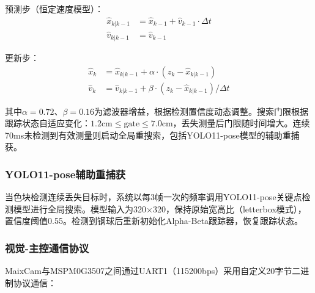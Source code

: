 \documentclass[12pt,a4paper]{ctexart}
\begin{document}
预测步（恒定速度模型）：
\begin{equation}
\begin{aligned}
\hat{x}_{k|k-1} &= \hat{x}_{k-1} + \hat{v}_{k-1} \cdot \Delta t \\
\hat{v}_{k|k-1} &= \hat{v}_{k-1}
\end{aligned}
\end{equation}

更新步：
\begin{equation}
\begin{aligned}
\hat{x}_k &= \hat{x}_{k|k-1} + \alpha \cdot (z_k - \hat{x}_{k|k-1}) \\
\hat{v}_k &= \hat{v}_{k|k-1} + \beta \cdot (z_k - \hat{x}_{k|k-1}) / \Delta t
\end{aligned}
\end{equation}

其中$\alpha=0.72$、$\beta=0.16$为滤波器增益，根据检测置信度动态调整。搜索门限根据跟踪状态自适应变化：$1.2\text{cm} \leq \text{gate} \leq 7.0\text{cm}$，丢失测量后门限随时间增大。连续70ms未检测到有效测量则启动全局重搜索，包括YOLO11-pose模型的辅助重捕获。

\subsubsection{YOLO11-pose辅助重捕获}

当色块检测连续丢失目标时，系统以每3帧一次的频率调用YOLO11-pose关键点检测模型进行全局搜索。模型输入为320×320，保持原始宽高比（letterbox模式），置信度阈值0.55。检测到钢球后重新初始化Alpha-Beta跟踪器，恢复跟踪状态。

\subsubsection{视觉-主控通信协议}

MaixCam与MSPM0G3507之间通过UART1（115200bps）采用自定义20字节二进制协议通信：
\end{document}
